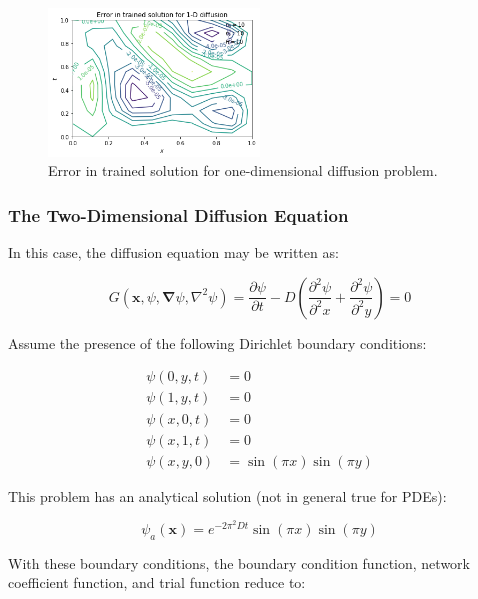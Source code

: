 \documentclass{article}
\begin{document}
\begin{figure}
    \centering
    \includegraphics[width=0.5\textwidth]{figures/diff1d_error.png}
    \caption{Error in trained solution for one-dimensional diffusion problem.}
    \label{fig:diff1d_error}
\end{figure}

\subsubsection{The Two-Dimensional Diffusion Equation}

In this case, the diffusion equation may be written as:

\begin{equation}
  G \left( \mathbf x, \psi, \mathbf \nabla \psi, \nabla^2 \psi \right) = \frac {\partial \psi} {\partial t} - D \left( \frac {\partial^2 \psi} {\partial^2 x} +  \frac {\partial^2 \psi} {\partial^2 y} \right) = 0
\end{equation}

Assume the presence of the following Dirichlet boundary conditions:

\begin{equation}
\begin{split}
  \psi(0,y,t) &= 0 \\
  \psi(1,y,t) &= 0 \\
  \psi(x,0,t) &= 0 \\
  \psi(x,1,t) &= 0 \\
  \psi(x,y,0) &= \sin(\pi x) \sin(\pi y)
\end{split}
\end{equation}

This problem has an analytical solution (not in general true for PDEs):

\begin{equation}
  \psi_a(\mathbf x) = e^{-2\pi^2 D t} \sin(\pi x) \sin(\pi y)
\end{equation}

With these boundary conditions, the boundary condition function, network coefficient function, and trial function reduce to:
\end{document}
